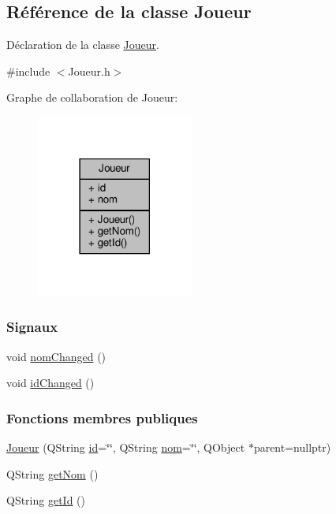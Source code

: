 \hypertarget{class_joueur}{}\subsection{Référence de la classe Joueur}
\label{class_joueur}


Déclaration de la classe \hyperlink{class_joueur}{Joueur}.  




{\ttfamily \#include $<$Joueur.\+h$>$}



Graphe de collaboration de Joueur\+:\nopagebreak
\begin{figure}[H]
\begin{center}
\leavevmode
\includegraphics[width=146pt]{class_joueur__coll__graph}
\end{center}
\end{figure}
\subsubsection*{Signaux}
\begin{DoxyCompactItemize}
\item 
void \hyperlink{class_joueur_ad1e3e8841ef26f9d6e01217c4722aea6}{nom\+Changed} ()
\item 
void \hyperlink{class_joueur_ada9bb10936494693e15861020ad07ab2}{id\+Changed} ()
\end{DoxyCompactItemize}
\subsubsection*{Fonctions membres publiques}
\begin{DoxyCompactItemize}
\item 
\hyperlink{class_joueur_a36774818f07cf7a06681250dca1fdd81}{Joueur} (Q\+String \hyperlink{class_joueur_a99c42cd3be344a1348064aca8619c82b}{id}=\char`\"{}\char`\"{}, Q\+String \hyperlink{class_joueur_ab06d7f1e6b482299bb03919e0cd2166d}{nom}=\char`\"{}\char`\"{}, Q\+Object $\ast$parent=nullptr)
\item 
Q\+String \hyperlink{class_joueur_a0a9e2adb0d6816def1d5894c389dac96}{get\+Nom} ()
\item 
Q\+String \hyperlink{class_joueur_a51dd9768967c044036b7d1405370b99d}{get\+Id} ()
\end{DoxyCompactItemize}
